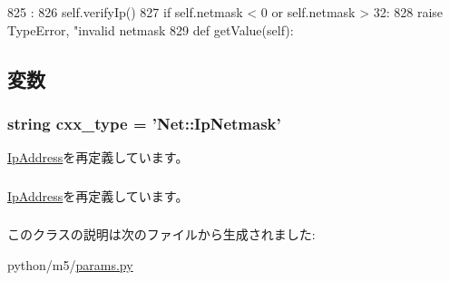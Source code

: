 \begin{DoxyCode}
825                     :
826         self.verifyIp()
827         if self.netmask < 0 or self.netmask > 32:
828             raise TypeError, "invalid netmask %
829 
    def getValue(self):
\end{DoxyCode}


\subsection{変数}
\hypertarget{classm5_1_1params_1_1IpNetmask_a2f1553ebb79374a68b36fdd6d8d82fc3}{
\subsubsection[{cxx\_\-type}]{\setlength{\rightskip}{0pt plus 5cm}string {\bf cxx\_\-type} = '{\bf Net::IpNetmask}'}}
\label{classm5_1_1params_1_1IpNetmask_a2f1553ebb79374a68b36fdd6d8d82fc3}


\hyperlink{classm5_1_1params_1_1IpAddress_a2f1553ebb79374a68b36fdd6d8d82fc3}{IpAddress}を再定義しています。\hypertarget{classm5_1_1params_1_1IpNetmask_afd65cf072a93c93ad52b9f25b341e10b}{
\subsubsection[{ip}]{}}
\label{classm5_1_1params_1_1IpNetmask_afd65cf072a93c93ad52b9f25b341e10b}


\hyperlink{classm5_1_1params_1_1IpAddress_afd65cf072a93c93ad52b9f25b341e10b}{IpAddress}を再定義しています。\hypertarget{classm5_1_1params_1_1IpNetmask_a359f0484d4ac0d41935005644fe6c8b4}{
\subsubsection[{netmask}]{}}
\label{classm5_1_1params_1_1IpNetmask_a359f0484d4ac0d41935005644fe6c8b4}


このクラスの説明は次のファイルから生成されました:\begin{DoxyCompactItemize}
\item 
python/m5/\hyperlink{params_8py}{params.py}\end{DoxyCompactItemize}
